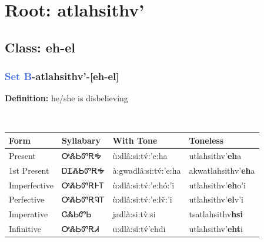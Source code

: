 \needspace{4in}
\section*{Root: atlahsithv'}
\nopagebreak
{}
\needspace{3in}
\subsection*{Class: eh-el}
\nopagebreak
\needspace{2in}
\subsubsection*{\textcolor{RoyalBlue}{Set B}{-}\textbf{atlahsithv'}{-}[eh-el]}
\nopagebreak
\textbf{Definition: } he/she is disbelieving
\\[0.5em]
\begin{tabularx}{\textwidth}{l X X X}%
\toprule%
\textbf{Form}&\textbf{Syllabary}&\textbf{With Tone}&\textbf{Toneless}\\%
\midrule%
Present&ᎤᏜᏏᏛᎡᎭ&ù:dlâ:si:tv́:’e:ha&utlahsithv'\textbf{eh}a\\%
1st Present&ᎠᏆᏜᏏᏛᎡᎭ&à:gwadlâ:si:tv́:’e:ha&akwatlahsithv'\textbf{eh}a\\%
Imperfective&ᎤᏜᏏᏛᎡᎰᎢ&ù:dlâ:si:tv́:’e:hó:’i&utlahsithv'\textbf{eh}o'i\\%
Perfective&ᎤᏜᏏᏛᎡᎸᎢ&ù:dlâ:si:tv́:’e:lv̌:’i&utlahsithv'\textbf{el}v'i\\%
Imperative&ᏣᏜᏏᏛᏏ&jadlà:si:tv̀:si&tsatlahsithv\textbf{hsi}\\%
Infinitive&ᎤᏜᏏᏛᎡᏗ&u:dlà:sǐ:tv́’ehdi&utlahsithv'\textbf{eht}i\\%
\bottomrule%
\end{tabularx}
\\[1em]